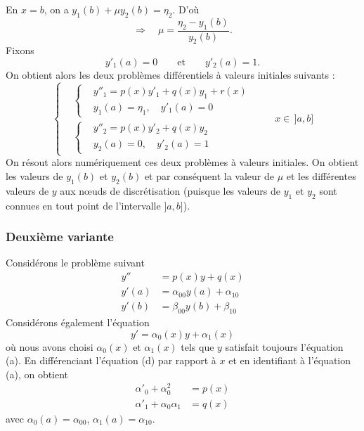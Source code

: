 En $x = b$, on a $y_1(b) + \mu y_2(b) = \eta_2$. D'où
\[
  \Longrightarrow\quad \mu = \frac{\eta_2 - y_1(b)}{y_2(b)} .
\]
Fixons
\[
  y'_1(a) = 0 \qquad\text{et}\qquad y'_2(a) = 1 .
\]
On obtient alors les deux problèmes différentiels à valeurs initiales
suivants :
\[
  \left\{
  \begin{aligned}
    &\left\{
    \begin{aligned}
      &y''_1 = p(x)y'_1 + q(x)y_1 + r(x)\\
      &y_1(a) = \eta_1, \quad y'_1(a) = 0
    \end{aligned}
    \right.\\[0.4em]
    &\left\{
    \begin{aligned}
      &y''_2 = p(x)y'_2 + q(x)y_2\\
      &y_2(a) = 0, \quad y'_2(a) = 1
    \end{aligned}
    \right.
  \end{aligned}
  \right.
  \qquad x \in\, ]a, b]
\]
On résout alors numériquement ces deux problèmes à valeurs initiales. On
obtient les valeurs de $y_1(b)$ et $y_2(b)$ et par conséquent la valeur de
$\mu$ et les différentes valeurs de $y$ aux n\oe uds de discrétisation
(puisque les valeurs de $y_1$ et $y_2$ sont connues en tout point de
l'intervalle $]a,b]$).

\subsubsection{Deuxième variante}

Considérons le problème suivant
\begin{align}
  y'' &= p(x)y + q(x) \tag{a}\\
  y'(a) &= \alpha_{00}y(a) + \alpha_{10} \tag{b}\\
  y'(b) &= \beta_{00}y(b) + \beta_{10} \tag{c}
\end{align}
Considérons également l'équation
\begin{equation}
  y' = \alpha_0(x)y + \alpha_1(x) \tag{d}
\end{equation}
où nous avons choisi $\alpha_0(x)$ et $\alpha_1(x)$ tels que $y$ satisfait
toujours l'équation (a). En différenciant l'équation (d) par rapport à $x$ et
en identifiant à l'équation (a), on obtient
\begin{align}
  \alpha'_0 + \alpha_0^2 &= p(x) \tag{e}\\
  \alpha'_1 + \alpha_0\alpha_1 &= q(x) \tag{f}
\end{align}
avec $\alpha_0(a) = \alpha_{00}$, $\alpha_1(a) = \alpha_{10}$.

